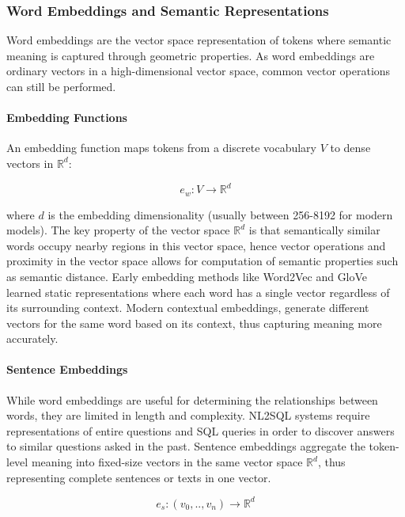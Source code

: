 \subsubsection{Word Embeddings and Semantic Representations}

Word embeddings are the vector space representation of tokens where semantic
meaning is captured through geometric properties. As word embeddings are
ordinary vectors in a high-dimensional vector space, common vector operations
can still be performed.

\paragraph{Embedding Functions}

An embedding function maps tokens from a discrete vocabulary $V$ to dense
vectors in $\mathbb{R}^d$:

\begin{equation}
e_{w}: V \rightarrow \mathbb{R}^d
\end{equation}

where $d$ is the embedding dimensionality (usually between 256-8192 for modern
models). The key property of the vector space $\mathbb{R}^d$ is that
semantically similar words occupy nearby regions in this vector space, hence
vector operations and proximity in the vector space allows for computation of
semantic properties such as semantic distance. Early embedding methods like
Word2Vec and GloVe learned static representations where each word has a single
vector regardless of its surrounding context. Modern contextual embeddings,
generate different vectors for the same word based on its context, thus
capturing meaning more accurately.

\paragraph{Sentence Embeddings}

While word embeddings are useful for determining the relationships between
words, they are limited in length and complexity. NL2SQL systems require
representations of entire questions and SQL queries in order to discover
answers to similar questions asked in the past. Sentence embeddings aggregate
the token-level meaning into fixed-size vectors in the same vector space
$\mathbb{R}^d$, thus representing complete sentences or texts in one vector.

\begin{equation}
    e_{s}: (v_0, .., v_n) \rightarrow \mathbb{R}^d
\end{equation}

